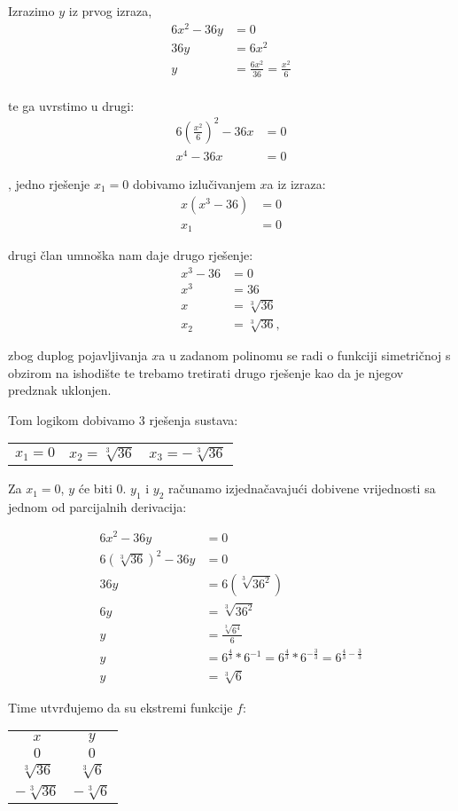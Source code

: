 Izrazimo $y$ iz prvog izraza,
\begin{align*}
    6x^2 - 36y &= 0 \\
    36y & = 6x^2 \\
    y & = \frac{6x^2}{36} = \frac{x^2}{6} \\
\end{align*}

te ga uvrstimo u drugi:
\begin{align*}
    6(\frac{x^2}{6})^2 - 36x & = 0 \\
    x^4 - 36x & = 0
\end{align*}

, jedno rješenje $x_1 = 0$ dobivamo izlučivanjem $x$a iz izraza:
\begin{align*}
    x(x^3 - 36) &= 0 \\
    x_1 &= 0
\end{align*}

drugi član umnoška nam daje drugo rješenje:
\begin{align*}
    x^3 - 36 &= 0 \\
    x^3 &= 36 \\
    x &= \sqrt[3]{36} \\
    x_2 &= \sqrt[3]{36},
\end{align*}

zbog duplog pojavljivanja $x$a u zadanom polinomu se radi o funkciji simetričnoj s obzirom na ishodište te trebamo tretirati drugo rješenje kao da je njegov predznak uklonjen.

Tom logikom dobivamo 3 rješenja sustava:
\begin{center}
\begin{tabular}{c c c}
    $x_1 = 0$ & $x_2 = \sqrt[3]{36}$ & $x_3 = -\sqrt[3]{36}$\\
\end{tabular}
\end{center}

Za $x_1 = 0$, $y$ će biti 0. $y_1$ i $y_2$ računamo izjednačavajući dobivene vrijednosti sa jednom od parcijalnih derivacija:

\begin{align*}
    6x^2 - 36y &= 0\\
    6(\sqrt[3]{36})^2 - 36y &= 0\\
    36y &= 6(\sqrt[3]{36^2})\\
    6y &= \sqrt[3]{36^2} \\
    y &= \frac{\sqrt[3]{6^4}}{6} \\
    y &= 6^{\frac{4}{3}} * 6^{-1} = 6^{\frac{4}{3}} * 6^{-\frac{3}{3}} = 6^{\frac{4}{3} - \frac{3}{3}} \\
    y &= \sqrt[3]6
\end{align*}

Time utvrđujemo da su ekstremi funkcije $f$:

\begin{center}
\begin{tabular}{c c}
    $x$ & $y$ \\
    $0$ & $0$ \\
    $\sqrt[3]{36}$ & $\sqrt[3]6$ \\
    $-\sqrt[3]{36}$ & $-\sqrt[3]6$ \\
\end{tabular}
\end{center}

\newpage